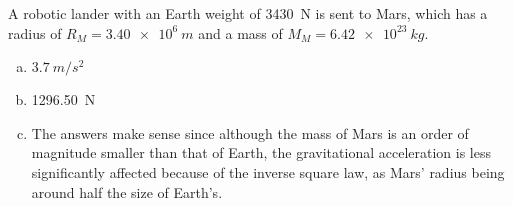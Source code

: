 \question A robotic lander with an Earth weight of \SI{3430}{N} is sent to Mars, which has a radius of $R_M = \SI{3.40e6}{m}$ and a mass of $M_M =\SI{6.42e23}{kg}$.
\begin{finalanswer}
\begin{enumerate}[(a)]
\item $\SI{3.7}{m/s^2}$
\item \SI{1296.50}{N}
\item The answers make sense since although the mass of Mars is an order of magnitude smaller than that of Earth, the gravitational acceleration is less significantly affected because of the inverse square law, as Mars' radius being around half the size of Earth's. 
\end{enumerate}
\end{finalanswer}
